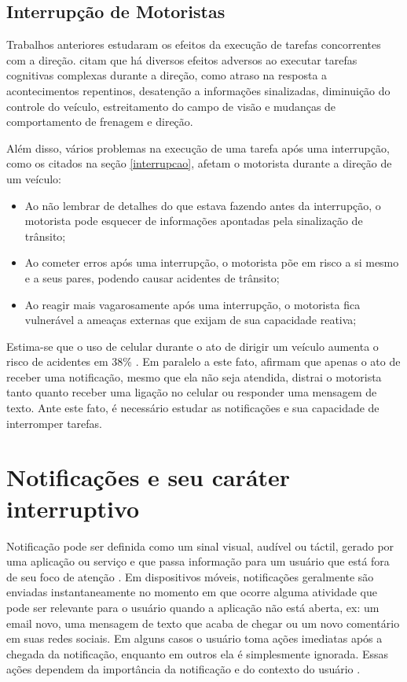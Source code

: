 \subsection{Interrupção de Motoristas}
\label{interrupcao-motoristas}

Trabalhos anteriores estudaram os efeitos da execução de tarefas concorrentes com a direção.  citam
que há diversos efeitos adversos ao executar tarefas cognitivas complexas durante a direção, como atraso na resposta a
acontecimentos repentinos, desatenção a informações sinalizadas, diminuição do controle do veículo, estreitamento do campo
de visão e mudanças de comportamento de frenagem e direção.

Além disso, vários problemas na execução de uma tarefa após uma interrupção, como os citados na seção \ref{interrupcao}, afetam o
motorista durante a direção de um veículo:

\begin{itemize}
  \item Ao não lembrar de detalhes do que estava fazendo antes da interrupção, o motorista pode esquecer de informações
  apontadas pela sinalização de trânsito;
  \item Ao cometer erros após uma interrupção, o motorista põe em risco a si mesmo e a seus pares, podendo causar acidentes
  de trânsito;
  \item Ao reagir mais vagarosamente após uma interrupção, o motorista fica vulnerável a ameaças externas que exijam de sua
  capacidade reativa;
\end{itemize}

Estima-se que o uso de celular durante o ato de dirigir um veículo aumenta o risco de acidentes em 38\% \cite{laberge2001wireless}.
Em paralelo a este fato,  afirmam que apenas o ato de receber uma notificação, mesmo que ela não seja
atendida, distrai o motorista tanto quanto receber uma ligação no celular ou responder uma mensagem de texto. Ante este fato, é
necessário estudar as notificações e sua capacidade de interromper tarefas.

\section{Notificações e seu caráter interruptivo}
\label{notificacao}

Notificação pode ser definida como um sinal visual, audível ou táctil, gerado por uma aplicação
ou serviço e que passa informação para um usuário que está fora de seu foco de atenção \cite{iqbal2010notifications}.
Em dispositivos móveis, notificações geralmente são enviadas instantaneamente no momento em que ocorre alguma atividade que pode ser relevante
para o usuário quando a aplicação não está aberta, ex: um email novo, uma mensagem de texto que acaba de chegar ou um
novo comentário em suas redes sociais. Em alguns casos o usuário toma ações imediatas após a chegada da notificação,
enquanto em outros ela é simplesmente ignorada. Essas ações dependem da importância da notificação e do contexto do
usuário \cite{sahami2014large}.

